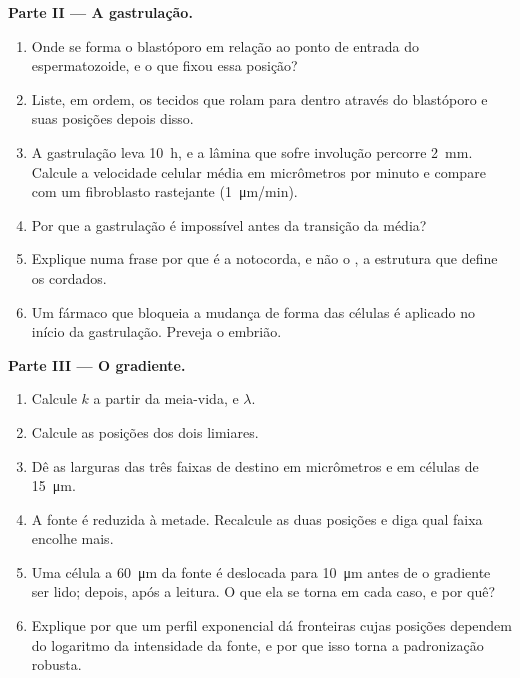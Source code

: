 \begin{problem}
\medskip
\noindent\textbf{Parte II --- A gastrulação.}
\begin{enumerate}[resume]
  \item Onde se forma o blastóporo em relação ao ponto de entrada do
        espermatozoide, e o que fixou essa posição?
  \item Liste, em ordem, os tecidos que rolam para dentro através do
        blastóporo e suas posições depois disso.
  \item A gastrulação leva \qty{10}{h}, e a lâmina que sofre involução
        percorre \qty{2}{mm}. Calcule a velocidade celular média em
        micrômetros por minuto e compare com um fibroblasto rastejante
        (\qty{1}{\micro m/min}).
  \item Por que a gastrulação é impossível antes da transição da
         média?
  \item Explique numa frase por que é a notocorda, e não o ,
        a estrutura que define os cordados.
  \item Um fármaco que bloqueia a mudança de forma das células é
        aplicado no início da gastrulação. Preveja o embrião.
\end{enumerate}

\medskip
\noindent\textbf{Parte III --- O gradiente.}
\begin{enumerate}[resume]
  \item Calcule $k$ a partir da meia-vida, e $\lambda$.
  \item Calcule as posições dos dois limiares.
  \item Dê as larguras das três faixas de destino em micrômetros e em
        células de \qty{15}{\micro m}.
  \item A fonte é reduzida à metade. Recalcule as duas posições e diga
        qual faixa encolhe mais.
  \item Uma célula a \qty{60}{\micro m} da fonte é deslocada para
        \qty{10}{\micro m} antes de o gradiente ser lido; depois, após a
        leitura. O que ela se torna em cada caso, e por quê?
  \item Explique por que um perfil exponencial dá fronteiras cujas
        posições dependem do logaritmo da intensidade da fonte, e por
        que isso torna a padronização robusta.
\end{enumerate}


\end{problem}
